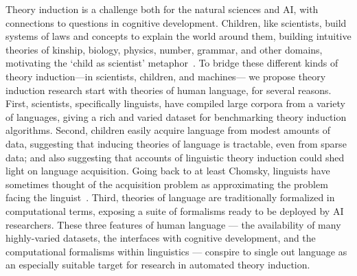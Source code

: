 \documentclass[12pt]{article}
\begin{document}
Theory induction is a challenge both for the natural sciences and AI,
with connections to questions in cognitive development.
Children, like scientists,
build systems of laws and concepts
to explain the world around them,
building intuitive theories of kinship, biology, physics, number,
grammar, and other domains, motivating the `child as scientist' metaphor~\cite{childAsScientist}.
To bridge these different kinds of theory induction---in scientists, children, and machines---
we propose theory induction research start with theories of human language,
for several reasons.
First, scientists, specifically linguists,
have compiled large corpora 
from a variety of languages,
giving a rich and varied dataset for benchmarking theory induction algorithms.
Second, children easily acquire language from
modest amounts of data,
suggesting that
inducing theories of language is tractable,
even from sparse data;
and also suggesting that accounts of
linguistic theory induction
could shed light on language acquisition.
Going back to at least Chomsky,
linguists have sometimes thought of the acquisition problem as
approximating the problem facing the linguist~\cite{chomsky1956three,chomsky1988current}.
Third,
theories of language
are traditionally formalized in computational terms,
exposing a suite of formalisms ready to be deployed by AI researchers.
These three features of human language --- the availability of many highly-varied datasets,
the interfaces with cognitive development,
and the computational formalisms within linguistics ---
conspire to single out language as an especially suitable target for
research in automated theory induction.
\end{document}
